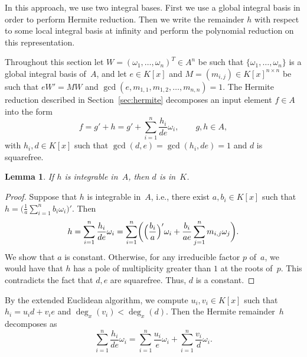 \documentclass{sig-alternate}
\newtheorem{lemma}[theorem]{Lemma}
\begin{document}
In this approach, we use two integral bases. First we use a global integral basis
in order to perform Hermite reduction. Then we write the
remainder $h$ with respect to some local integral basis at infinity and perform the
polynomial reduction on this representation.

Throughout this section let $W=(\omega_1,\ldots,\omega_n)^T\in A^n$ be such
that $\{\omega_1, \ldots, \omega_n\}$ is a global integral basis of~$A$, and
let $e\in K[x]$ and $M=(m_{i,j})\in K[x]^{n\times n}$ be such that $eW'=MW$
and $\gcd(e, m_{1, 1}, m_{1, 2}, \ldots, m_{n ,n})=1$. The Hermite reduction
described in Section~\ref{sec:hermite} decomposes an input element $f\in A$
into the form
\[
  f = g' + h = g' + \sum_{i=1}^n \frac{h_i}{de} \omega_i,\qquad
  g, h\in A,
\]
with $h_i, d\in K[x]$ such that $\gcd(d, e)=\gcd(h_i,de)=1$ and $d$ is squarefree.
\begin{lemma}\label{LEM:d}
If $h$ is integrable in~$A$, then $d$ is in~$K$.
\end{lemma}
\begin{proof}
Suppose that $h$ is integrable in~$A$, i.e., there exist $a, b_i\in K[x]$
such that $h = \bigl(\frac{1}{a}\sum_{i=1}^n b_i \omega_i\bigr)'$. Then
\[
  h = \sum_{i=1}^n \frac{h_i}{de}\omega_i= \sum_{i=1}^n \biggl(\Bigl(\frac{b_i}{a}\Bigr)' \omega_i +
  \frac{b_i}{a e} \sum_{j=1}^n  m_{i, j}\omega_j\biggr).
\]
We show that $a$ is constant. Otherwise, for any irreducible factor $p$ of~$a$, we would have that $h$ has a pole of
multiplicity greater than $1$ at the roots of~$p$. This contradicts
the fact that $d, e$ are squarefree. Thus, $d$ is a constant.
\end{proof}

By the extended Euclidean algorithm, we compute $u_i, v_i\in K[x]$ such that
$h_i = u_i d + v_i e$ and $\deg_x(v_i) < \deg_x(d)$. Then the Hermite remainder~$h$
decomposes as
\begin{equation}\label{EQ:h}
  \sum_{i=1}^n \frac{h_i}{de}\omega_i =  \sum_{i=1}^n \frac{u_i}{e}\omega_i + \sum_{i=1}^n \frac{v_i}{d}\omega_i.
\end{equation}
\end{document}
